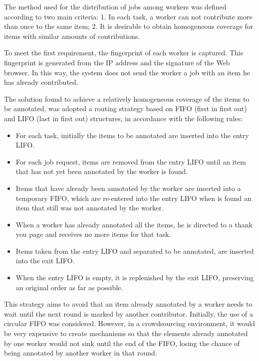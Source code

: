 The method used for the distribution of jobs among workers was defined according to two main criteria: 1. In each task, a worker can not contribute more than once to the same item; 2. It is desirable to obtain homogeneous coverage for items with similar amounts of contributions.

To meet the first requirement, the fingerprint of each worker is captured. This fingerprint is generated from the IP address and the signature of the Web browser. In this way, the system does not send the worker a job with an item he has already contributed.

The solution found to achieve a relatively homogeneous coverage of the items to be annotated, was adopted a routing strategy based on FIFO (first in first out) and LIFO (last in first out) structures, in accordance with the following rules:


\begin{itemize}

\item For each task, initially the items to be annotated are inserted into the entry LIFO.

\item For each job request, items are removed from the entry LIFO until an item that has not yet been annotated by the worker is found.

\item Items that have already been annotated by the worker are inserted into a temporary FIFO, which are re-entered into the entry LIFO when is found an item that still was not annotated by the worker.

\item When a worker has already annotated all the items, he is directed to a thank you page and receives no more items for that task.

\item Items taken from the entry LIFO and separated to be annotated, are inserted into the exit LIFO.

\item When the entry LIFO is empty, it is replenished by the exit LIFO, preserving an original order as far as possible.

\end{itemize}

This strategy aims to avoid that an item already annotated by a worker needs to wait until the next round is marked by another contributor. Initially, the use of a circular FIFO was considered. However, in a crowdsourcing environment, it would be very expensive to create mechanisms so that the elements already annotated by one worker would not sink until the end of the FIFO, losing the chance of being annotated by another worker in that round.
